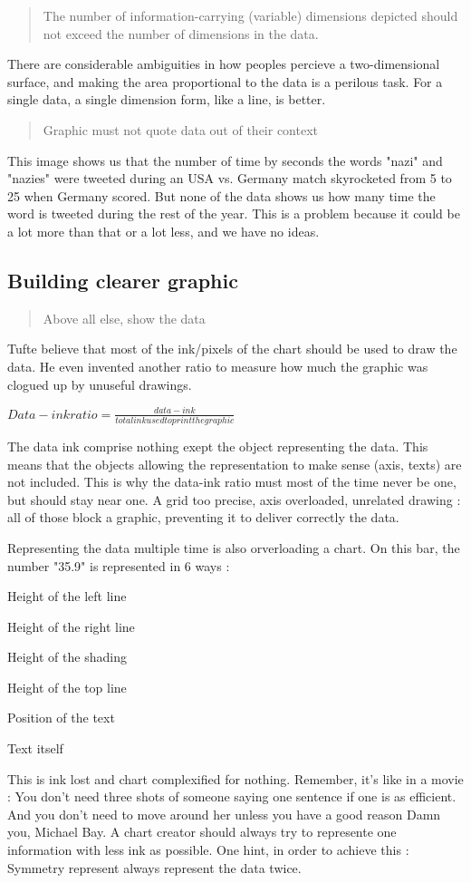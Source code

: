 \begin{quote}
The number of information-carrying (variable) dimensions depicted should not exceed the number of dimensions in the data.
\end{quote}
There are considerable ambiguities in how peoples percieve a two-dimensional surface, and making the area proportional to the data is a perilous task. For a single data, a single dimension form, like a line, is better.

\begin{quote}
Graphic must not quote data out of their context
\end{quote}
This image shows us that the number of time by seconds the words "nazi" and "nazies" were tweeted during an USA vs. Germany match skyrocketed from 5 to 25 when Germany scored.
But none of the data shows us how many time the word is tweeted during the rest of the year. This is a problem because it could be a lot more than that or a lot less, and we have no ideas.

\subsection{Building clearer graphic}
\begin{quote}
Above all else, show the data
\end{quote}

Tufte believe that most of the ink/pixels of the chart should be used to draw the data. He even invented another ratio to measure how much the graphic was clogued up by unuseful drawings.

$Data-ink ratio = \frac{data-ink}{total ink used to print the graphic}$

The data ink comprise nothing exept the object representing the data. This means that the objects allowing the representation to make sense (axis, texts) are not included. 
This is why the data-ink ratio must most of the time never be one, but should stay near one.
A grid too precise, axis overloaded, unrelated drawing : all of those block a graphic, preventing it to deliver correctly the data.

Representing the data multiple time is also orverloading a chart. On this bar, the number "35.9" is represented in 6 ways :
\begin{enum}
\item Height of the left line
\item Height of the right line
\item Height of the shading
\item Height of the top line
\item Position of the text
\item Text itself
\end{enum}
This is ink lost and chart complexified for nothing. Remember, it's like in a movie : You don't need three shots of someone saying one sentence if one is as efficient. And you don't need to move around her unless you have a good reason 
 Damn you, Michael Bay.
 A chart creator should always try to represente one information with less ink as possible.
 One hint, in order to achieve this : Symmetry represent always represent the data twice.

